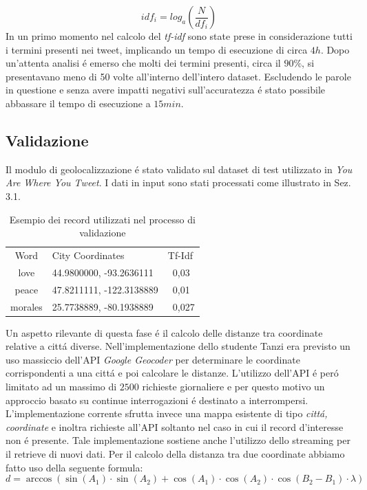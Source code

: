 \documentclass[twocolumn,10pt]{asme2ej}
\begin{document}
$$idf_i= log_{a}\left ( \frac{N}{df_i} \right )$$
In un primo momento nel calcolo del \textit{tf-idf} sono state prese in considerazione tutti i termini presenti nei tweet, implicando un tempo di esecuzione di circa $4h$. Dopo un'attenta analisi \'e emerso che molti dei termini presenti, circa il $90\%$, si presentavano meno di 50 volte all'interno dell'intero dataset. Escludendo le parole in questione e senza avere impatti negativi sull'accuratezza \'e stato possibile abbassare il tempo di esecuzione a $15 min$. 


\subsection{Validazione}

Il modulo di geolocalizzazione \'e stato validato sul dataset di test utilizzato in \textit{You Are Where You Tweet}. I dati in input sono stati processati come illustrato in Sez. 3.1. 
\begin{table}[t]
\caption{Esempio dei record utilizzati nel processo di validazione}
\begin{center}
\label{table_ASME}
\begin{tabular}{c l l}
& & \\ %
\hline
Word & City Coordinates &  Tf-Idf \\
\hline
love & 44.9800000, -93.2636111 & \ 0,03\\
peace &  47.8211111, -122.3138889 & \ 0,01 \\
morales & 25.7738889, -80.1938889 & \ 0,027 \\

\hline
\end{tabular}
\end{center}
\end{table}

Un aspetto rilevante di questa fase \'e il calcolo delle distanze tra coordinate relative a citt\'a diverse. Nell'implementazione dello studente Tanzi era previsto un uso massiccio dell'API \textit{Google Geocoder} per determinare le coordinate corrispondenti a una citt\'a e poi calcolare le distanze. L'utilizzo dell'API \'e per\'o limitato ad un massimo di $2500$ richieste giornaliere e per questo motivo un approccio basato su continue interrogazioni \'e destinato a interrompersi. L'implementazione corrente sfrutta invece una mappa esistente di tipo \textit{citt\'a, coordinate} e inoltra richieste all'API soltanto nel caso in cui il record d'interesse non \'e presente. Tale implementazione sostiene anche l'utilizzo dello streaming per il retrieve di nuovi dati. Per il calcolo della distanza tra due coordinate abbiamo fatto uso della seguente formula: 
$$d=  \arccos{\left ( \sin{\left (A_1 \right )} \cdot \sin{\left (A_2 \right )} + \cos{\left (A_1 \right )} \cdot \cos{\left (A_2 \right )} \cdot \cos{\left (B_2 - B_1 \right )} \cdot \lambda \right ) }$$
\end{document}

